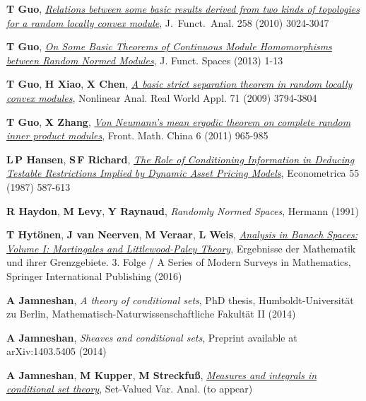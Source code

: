 \documentclass{jloganal}
\numberwithin{equation}{section}
\theoremstyle{plain}
\begin{document}
\begin{thebibliography}{}
\textbf{T Guo}, \href{http://dx.doi.org/10.1016/j.jfa.2010.02.002}
  {\emph{{Relations between some basic results derived from two kinds of
  topologies for a random locally convex module}}}, J.~Funct.~Anal. 258 (2010)
  3024-3047

\textbf{T Guo}, \href{http://dx.doi.org/10.1155/2013/989102} {\emph{{On Some
  Basic Theorems of Continuous Module Homomorphisms between Random Normed
  Modules}}}, J. Funct. Spaces  (2013) 1-13

\textbf{T Guo}, \textbf{H Xiao}, \textbf{X Chen},
  \href{http://dx.doi.org/10.1016/j.na.2009.02.038} {\emph{{A basic strict
  separation theorem in random locally convex modules}}}, Nonlinear Anal. Real
  World Appl. 71 (2009) 3794-3804

\textbf{T Guo}, \textbf{X Zhang},
  \href{http://dx.doi.org/10.1007/s11464-011-0139-4} {\emph{{Von Neumann's mean
  ergodic theorem on complete random inner product modules}}}, Front. Math.
  China 6 (2011) 965-985

\textbf{L\,P Hansen}, \textbf{S\,F Richard},
  \href{http://dx.doi.org/10.2307/1913601} {\emph{{The Role of Conditioning
  Information in Deducing Testable Restrictions Implied by Dynamic Asset
  Pricing Models}}}, Econometrica 55 (1987) 587-613

\textbf{R Haydon}, \textbf{M Levy}, \textbf{Y Raynaud}, \emph{Randomly Normed
  Spaces}, Hermann (1991)

\textbf{T Hyt{\"o}nen}, \textbf{J van Neerven}, \textbf{M Veraar}, \textbf{L
  Weis}, \href{http://dx.doi.org/10.1007/978-3-319-48520-1} {\emph{Analysis in
  Banach Spaces: Volume I: Martingales and Littlewood-Paley Theory}},
  Ergebnisse der Mathematik und ihrer Grenzgebiete. 3. Folge / A Series of
  Modern Surveys in Mathematics, Springer International Publishing (2016)

\textbf{A Jamneshan}, \emph{A theory of conditional sets}, PhD thesis,
  {Humboldt-Universit\"at zu Berlin, Mathematisch-Naturwissenschaftliche
  Fakult\"at II} (2014)

\textbf{A Jamneshan}, \emph{Sheaves and conditional sets}, 
Preprint available at arXiv:1403.5405 (2014)


\textbf{A Jamneshan}, \textbf{M Kupper}, \textbf{M Streckfu{\ss}},
  \href{http://dx.doi.org/10.1007/s11228-018-0478-3} {\emph{{Measures and
  integrals in conditional set theory}}}, Set-Valued Var. Anal.  (to appear)


\end{thebibliography}
\end{document}
